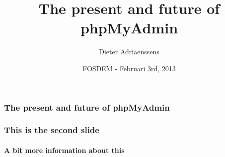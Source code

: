 \documentclass{beamer}
\title{The present and future of phpMyAdmin}
\author{Dieter Adriaenssens}
\institute{phpMyAdmin}
\date{FOSDEM - Februari 3rd, 2013}
\begin{document}
  \begin{frame}
  \frametitle{The present and future of phpMyAdmin}
  \end{frame}
  \begin{frame}
  \frametitle{This is the second slide}
  \framesubtitle{A bit more information about this}
  \end{frame}
\end{document}
